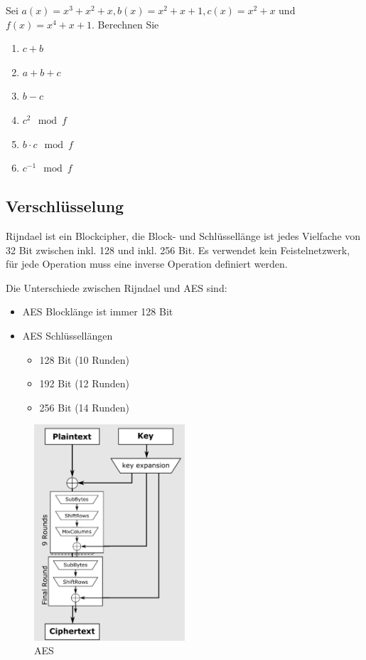 Sei $a(x) = x^3 + x^2 + x, b(x) = x^2+x+1, c(x) = x^2+x$ und $f(x) = x^4+x+1$. Berechnen Sie

\begin{enumerate}
    \item $c + b$
    \item $a + b + c$
    \item $b - c$
    \item $c^2 \mod f$
    \item $b \cdot c \mod f$
    \item $c^{-1} \mod f$
\end{enumerate}

\subsection{Verschlüsselung}

Rijndael ist ein Blockcipher, die Block- und Schlüssellänge ist jedes Vielfache von 32 Bit zwischen inkl. 128 und inkl. 256 Bit.
Es verwendet kein Feistelnetzwerk, für jede Operation muss eine inverse Operation definiert werden.

Die Unterschiede zwischen Rijndael und AES sind:
\begin{itemize}
    \item AES Blocklänge ist immer 128 Bit
    \item AES Schlüssellängen
    \begin{itemize}
        \item 128 Bit (10 Runden)
        \item 192 Bit (12 Runden)
        \item 256 Bit (14 Runden)
    \end{itemize}
\end{itemize}

\begin{figure}[h]
    \includegraphics[width=0.5\textwidth]{figures/fig06-aes}
    \centering
    \caption{AES}
\end{figure}

